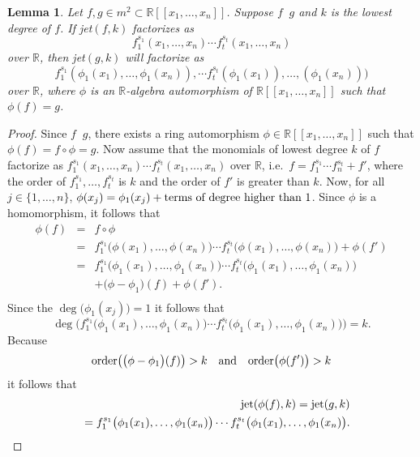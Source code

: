 \documentclass{amsproc}
\DeclareMathOperator{\requiv}{\overset{r}{\sim}}
\begin{document}
\newtheorem{kjet}{Lemma}[section]
\begin{kjet}\label{kjet}
Let $f,g\in m^2\subset\mathbb R[[x_1,\ldots,x_n]]$. Suppose $f\requiv g$ and $k$
is the lowest degree of $f$. If jet$(f,k)$ factorizes as \[f_1^{s_1}(x_1,\ldots,x_n)\cdots f_t^{s_t}(x_1,\ldots,x_n)\] over $\mathbb R$, then jet$(g,k)$ will factorize as \[f_1^{s_1} (\phi_1(x_1),\ldots,\phi_1(x_n)),\cdots f_t^{s_t}(\phi_1(x_1)),\ldots,(\phi_1(x_n)))\] over $\mathbb R$, where $\phi$ is an $\mathbb R$-algebra automorphism of $\mathbb R[[x_1,\ldots,x_n]]$ such that $\phi(f)=g$. 
\end{kjet}
\begin{proof}
Since $f\requiv g$, there exists a ring automorphism $\phi\in\mathbb R[[x_1,\ldots,x_n]]$ such that  $\phi(f)=f\circ\phi=g$. Now assume that the monomials of lowest degree $k$ of $f$ factorize as $f_1^{s_1}(x_1,\ldots,x_n)\cdots f_t^{s_t}(x_1,\ldots,x_n)$ over $\mathbb R$, i.e.~$f=f_1^{s_1}\cdots f_n^{s_t}+f'$, where the order of $f_1^{s_1},\ldots,f_t^{s_t}$ is $k$ and the order of $f'$ is greater than $k$. 
Now, for all $j\in\{1,\ldots,n\}$, $\phi(x_j)=\phi_1(x_j)+\textnormal{terms of
degree higher than $1$}$. Since $\phi$ is a homomorphism, it follows that
\begin{eqnarray*}\phi(f)&=&f\circ\phi\\&=&f_1^{s_1}\big(\phi(x_1),\ldots,\phi(x_n)\big)\cdots f_t^{s_t}\big(\phi(x_1),\ldots,\phi(x_n)\big)+\phi(f')\\&=&f_1^{s_1}\big(\phi_1(x_1),\ldots,\phi_1(x_n)\big)\cdots f_t^{s_t}\big(\phi_1(x_1),\ldots,\phi_1(x_n)\big)\\&&+\big(\phi-\phi_1\big)(f)+\phi(f').\\\end{eqnarray*}
Since the $\deg\big(\phi_1(x_j))=1$ it follows that \[\deg\big(f_1^{s_1}\big(\phi_1(x_1),\ldots,\phi_1(x_n)\big)\cdots f_t^{s_t}\big(\phi_1(x_1),\ldots,\phi_1(x_n)\big)\big)=k.\] Because 
\[\textnormal{order}\big(\big(\phi-\phi_1\big)(f)\big)>k\quad\textnormal{and}\quad\textnormal{order}\big(\phi(f')\big)>k\]
it follows that
\begin{eqnarray*}
&&\textnormal{jet}(\phi(f),k)=\textnormal{jet}(g,k)\\&&=f_1^{s_1}\big(\phi_1(x_1),\ldots,\phi_1(x_n)\big)\cdots f_t^{s_t}\big(\phi_1(x_1),\ldots,\phi_1(x_n)\big).
\end{eqnarray*}
\end{proof}
\end{document}
